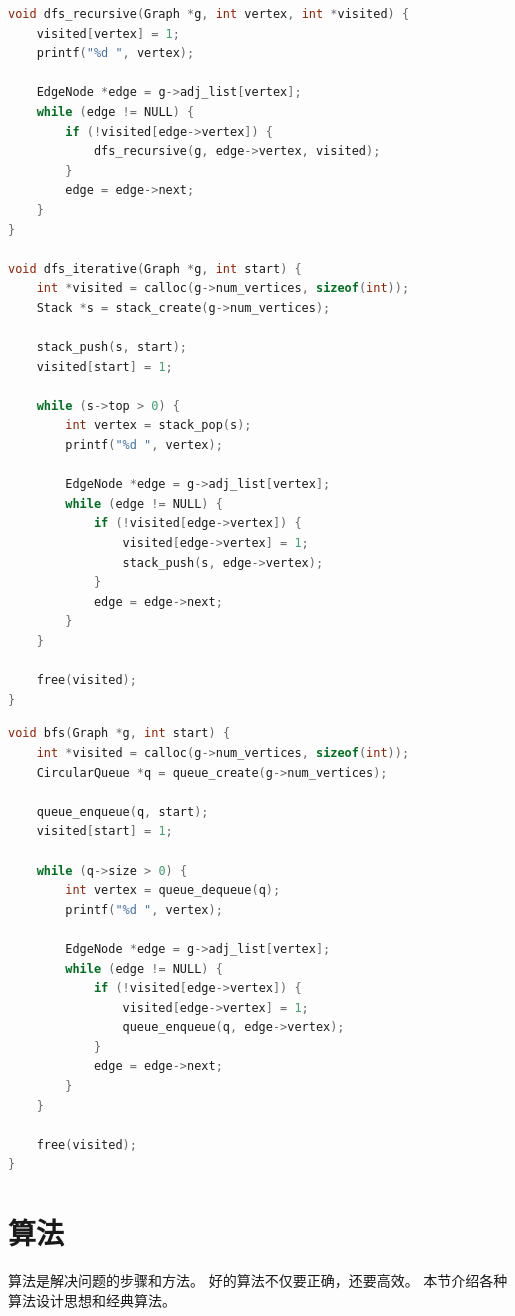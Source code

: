 \begin{lstlisting}[language=C, caption={图的深度优先搜索}]
void dfs_recursive(Graph *g, int vertex, int *visited) {
    visited[vertex] = 1;
    printf("%d ", vertex);

    EdgeNode *edge = g->adj_list[vertex];
    while (edge != NULL) {
        if (!visited[edge->vertex]) {
            dfs_recursive(g, edge->vertex, visited);
        }
        edge = edge->next;
    }
}

void dfs_iterative(Graph *g, int start) {
    int *visited = calloc(g->num_vertices, sizeof(int));
    Stack *s = stack_create(g->num_vertices);

    stack_push(s, start);
    visited[start] = 1;

    while (s->top > 0) {
        int vertex = stack_pop(s);
        printf("%d ", vertex);

        EdgeNode *edge = g->adj_list[vertex];
        while (edge != NULL) {
            if (!visited[edge->vertex]) {
                visited[edge->vertex] = 1;
                stack_push(s, edge->vertex);
            }
            edge = edge->next;
        }
    }

    free(visited);
}
\end{lstlisting}

\begin{lstlisting}[language=C, caption={图的广度优先搜索}]
void bfs(Graph *g, int start) {
    int *visited = calloc(g->num_vertices, sizeof(int));
    CircularQueue *q = queue_create(g->num_vertices);

    queue_enqueue(q, start);
    visited[start] = 1;

    while (q->size > 0) {
        int vertex = queue_dequeue(q);
        printf("%d ", vertex);

        EdgeNode *edge = g->adj_list[vertex];
        while (edge != NULL) {
            if (!visited[edge->vertex]) {
                visited[edge->vertex] = 1;
                queue_enqueue(q, edge->vertex);
            }
            edge = edge->next;
        }
    }

    free(visited);
}
\end{lstlisting}

\section{算法}

算法是解决问题的步骤和方法。
好的算法不仅要正确，还要高效。
本节介绍各种算法设计思想和经典算法。


